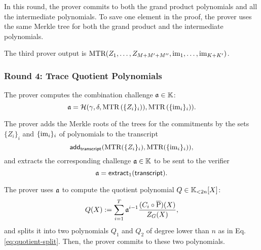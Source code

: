 In this round, the prover commits to both the grand product polynomials and all the intermediate polynomials. To save one element in the proof, the prover uses the same Merkle tree for both the grand product and the intermediate polynomials.%

The third prover output is $\text{MTR}(Z_1,\dots,Z_{M+M'+M''},\text{im}_1,\dots,\text{im}_{K+K'})$.


\subsubsection*{Round 4: Trace Quotient Polynomials}

\ifNOPOLYGON
The prover computes the combination challenge $\mathfrak{a} \in \mathbb{K}$:
\[
  \mathfrak{a} = \mathcal{H}(\gamma,\delta,\text{MTR}\left(\{Z_i\}_i\right)),\text{MTR}\left(\{\text{im}_i\}_i\right)).
\]
\fi

\ifPOLYGON
The prover adds the Merkle roots of the trees for the commitments by the sets $\{Z_i\}_i$ and $\{\text{im}_i\}_i$ of polynomials to the transcript
\[
\textsf{add}_{\textsf{transcript}}(\text{MTR}(\{Z_i\}_i), \text{MTR}(\{\text{im}_i\}_i)),
\]
and extracts the corresponding challenge $\mathfrak{a} \in \mathbb{K}$ to be sent to the verifier
\[
\mathfrak{a} = \mathsf{extract}_{1}(\textsf{transcript}).
\]
\fi

The prover uses $\mathfrak{a}$ to compute the quotient polynomial $Q \in \mathbb{K}_{<2n}[X]$: 
\[
  Q(X) := \sum_{i=1}^T \mathfrak{a}^{i-1} \frac{(C_i \circ \overline{\text{P}})(X)}{Z_G(X)},
\]
and splits it into two polynomials $Q_1$ and $Q_2$ of degree lower than $n$ as in Eq. \eqref{eq:quotient-split}. Then, the prover commits to these two polynomials.


